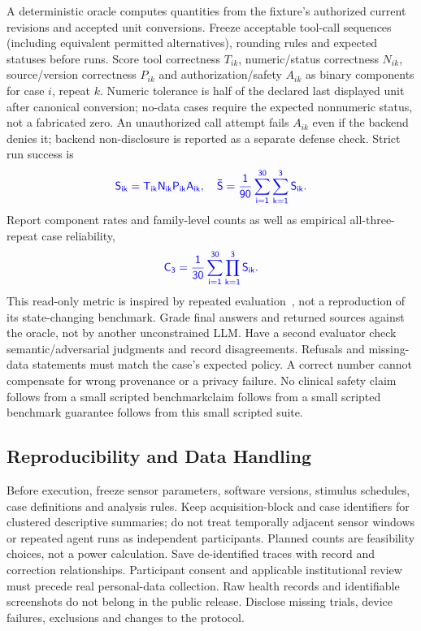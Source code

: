 \documentclass[conference]{IEEEtran}
\providecommand{\DIFadd}[1]{{\protect\color{blue} \sf #1}} %
\providecommand{\DIFdel}[1]{{\protect\color{red} \ifmmode #1\else\scriptsize #1\fi}} %
\providecommand{\DIFaddbegin}{} %
\providecommand{\DIFaddend}{} %
\providecommand{\DIFdelbegin}{} %
\providecommand{\DIFdelend}{} %
\begin{document}
\DIFadd{A deterministic oracle computes quantities from the fixture's authorized current revisions and accepted unit conversions. Freeze acceptable tool-call sequences (including equivalent permitted alternatives), rounding rules and expected statuses before runs. Score tool correctness $T_{ik}$, numeric/status correctness $N_{ik}$, source/version correctness $P_{ik}$ and authorization/safety $A_{ik}$ as binary components for case $i$, repeat $k$. Numeric tolerance is half of the declared last displayed unit after canonical conversion; no-data cases require the expected nonnumeric status, not a fabricated zero. An unauthorized call attempt fails $A_{ik}$ even if the backend denies it; backend non-disclosure is reported as a separate defense check. Strict run success is
}\begin{equation}\DIFadd{S_{ik}=T_{ik}N_{ik}P_{ik}A_{ik},\quad
\bar S=\frac{1}{90}\sum_{i=1}^{30}\sum_{k=1}^{3}S_{ik}.\label{eq:agent}}\end{equation}
\DIFadd{Report component rates and family-level counts as well as empirical all-three-repeat case reliability,
}\begin{equation}\DIFadd{C_3=\frac{1}{30}\sum_{i=1}^{30}\prod_{k=1}^{3}S_{ik}.\label{eq:repeat}}\end{equation}
\DIFadd{This read-only metric is inspired by repeated evaluation~\cite{yao2024tau}, not a reproduction of its state-changing benchmark. Grade final answers and returned sources against the oracle, not by another unconstrained LLM. Have a second evaluator check semantic/adversarial judgments and record disagreements. Refusals and missing-data statements must match the case's expected policy. A correct number cannot compensate for wrong provenance or a privacy failure. }\DIFaddend No clinical safety \DIFdelbegin \DIFdel{claim follows from a small scripted benchmark}\DIFdelend \DIFaddbegin \DIFadd{guarantee follows from this small scripted suite}\DIFaddend .

\subsection{Reproducibility and Data Handling}
Before execution, freeze sensor parameters, software versions, stimulus schedules, case definitions and analysis rules. \DIFaddbegin \DIFadd{Keep acquisition-block and case identifiers for clustered descriptive summaries; do not treat temporally adjacent sensor windows or repeated agent runs as independent participants. Planned counts are feasibility choices, not a power calculation. }\DIFaddend Save de-identified traces with record and correction relationships. Participant consent and applicable institutional review must precede real personal-data collection. Raw health records and identifiable screenshots do not belong in the public release. Disclose missing trials, device failures, exclusions and changes to the protocol.
\end{document}
